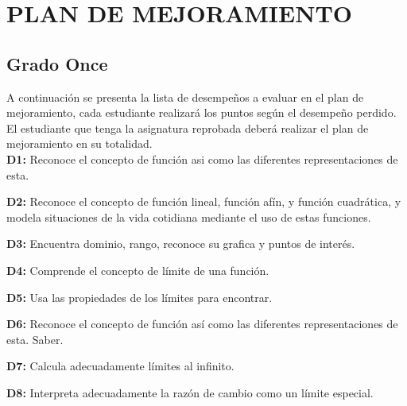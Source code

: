 \documentclass[spanish,12pt,a4paper]{article}
\begin{document}
	\vspace{0.5cm}
	\section*{PLAN DE MEJORAMIENTO}
	\subsection*{Grado Once}
	
	A continuación se presenta la lista de desempeños a evaluar en el plan de mejoramiento, cada estudiante realizará los puntos según el desempeño perdido. El estudiante que tenga la asignatura reprobada deberá realizar el plan de mejoramiento en su totalidad.\\
	
	
	\textbf{D1:} Reconoce el concepto de función asi como las diferentes representaciones de esta.
	
	\textbf{D2:} Reconoce el concepto de función lineal, función afín, y función cuadrática, y modela situaciones de la vida cotidiana mediante el uso de estas funciones.
	
	\textbf{D3:} Encuentra dominio, rango, reconoce su grafica y puntos de interés.
	
	\textbf{D4:} Comprende el concepto de límite de una función.
	
	\textbf{D5:} Usa las propiedades de los límites para encontrar.
	
	\textbf{D6:} Reconoce el concepto de función así como las diferentes representaciones de esta. Saber.
	
	\textbf{D7:} Calcula adecuadamente límites al infinito.
	
	\textbf{D8:} Interpreta adecuadamente la razón de cambio como un límite especial.
	
	
	
	\vspace{1cm}
	
\end{document}
